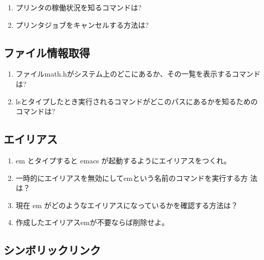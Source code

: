 \documentclass[11pt, twocolumn, ]{jsarticle}
\begin{document}
\begin{enumerate}
\item
  プリンタの稼働状況を知るコマンドは?
\item
  プリンタジョブをキャンセルする方法は?
\end{enumerate}

\hypertarget{ux30d5ux30a1ux30a4ux30ebux60c5ux5831ux53d6ux5f97}{%
\subsection{ファイル情報取得}\label{ux30d5ux30a1ux30a4ux30ebux60c5ux5831ux53d6ux5f97}}

\begin{enumerate}
\item
  ファイルmath.hがシステム上のどこにあるか、その一覧を表示するコマンドは?
\item
  lsとタイプしたとき実行されるコマンドがどこのパスにあるかを知るためのコマンドは?
\end{enumerate}

\hypertarget{ux30a8ux30a4ux30eaux30a2ux30b9}{%
\subsection{エイリアス}\label{ux30a8ux30a4ux30eaux30a2ux30b9}}

\begin{enumerate}
\item
  em とタイプすると emacs が起動するようにエイリアスをつくれ。
\item
  一時的にエイリアスを無効にしてemという名前のコマンドを実行する方
  法は？
\item
  現在 em がどのようなエイリアスになっているかを確認する方法は？
\item
  作成したエイリアスemが不要ならば削除せよ。
\end{enumerate}

\hypertarget{ux30b7ux30f3ux30dcux30eaux30c3ux30afux30eaux30f3ux30af}{%
\subsection{シンボリックリンク}\label{ux30b7ux30f3ux30dcux30eaux30c3ux30afux30eaux30f3ux30af}}
\end{document}
